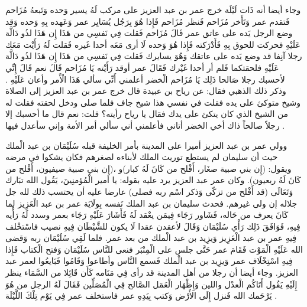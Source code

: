 وجاء أيضا أنه ذَات لَيْلَة خرج عمر بن عبد العزيز على مركب لَهُ يسير وَحده وَتَبعهُ مُزَاحم فَتقدم عمر وَتَأَخر مُزَاحم فَنظر مُزَاحم فَإِذا هُوَ بِرَجُل يُسَايِر عمر وَعَهده بِهِ وَحده وَقد وضع الرجل يَده على عاتق عمر قَالَ مُزَاحم فَقلت فِي نَفسِي من هَذَا إِن هَذَا لذُو دَالَّة عَلَيْهِ فحركت للحوق بِهِ فَأَدْرَكته فَإِذا هُوَ وَحده لَا أرى مَعَه أحدا غَيره فَقلت لَهُ رَأَيْت مَعَك رجلا آنِفا قد وضع يَده على عاتقك وَهُوَ يسايرك فَقلت فِي نَفسِي من هَذَا إِن هَذَا لذُو دَالَّة عَلَيْهِ فلحقتكما فَلم أر أحدا غَيْرك فَقَالَ عمر أوقد رَأَيْته يَا مُزَاحم قَالَ نعم قَالَ إِنِّي لأحسبك رجلا صَالحا ذَلِك يَا مُزَاحم الْخضر أعلمني أَنِّي سألي هَذَا الْأَمر وأعان عَلَيْهِ \cite{ibnAbdAlHakam_OmarIbnAbdAlAziz}. وذكر ذلك الذهبي فقال:  عن رياح بن عبيدة قال خرج عمر بن عبد العزيز إلى الصلاة وشيخ متوكئ على يده فقلت في نفسي هذا شيخ جاف فلما صلى ودخل لحقته فقلت له من الشيخ الذي كان يتكئ على يدك فقال يا رياح رأيته؟ قلت: نعم قال ما أحسبك إلا رجلاً صالحاً ذاك أخي الخضر أتاني فأعلمني أني سألي أمر الأمة وإني سأعدل فيها \cite{dahabi_Siyar}.

وولي عمر بن عبد العزيز أميرا على المدينة بأمر الخليفة قبله سُلَيْمَان بن عبد الْملك حيث أن سليمان لم يستطع توريث الملك لأبناءه لصغرهم فكان يشكوا في مرضه ويقول: (إِن بني صبية صغَار، أَفْلح من كَانَ لَهُ كبار)و ،(إِن بني صبية صيفيون، أَفْلح من كَانَ لَهُ ربعيون). وكان عمر عبد العزيز يرد عليه بقوله: يا أمير الْمُؤمنِينَ، يَقُول الله تبَارك وَتَعَالَى (قد أَفْلح من تزكّى وَذكر اسْم ربه فصلى) عارضا عليه أن يحتسب ذلك لله جل جلاله إن ولى غيرهم. فحدث سليمان بن عبد الملك نَفسه بِولَايَة عمر بن عبد الْعَزِيز لما كَانَ يعرف من حَاله، فَشَاور رَجَاء فِيمَن يعْقد لَهُ فَأَشَارَ عَلَيْهِ رَجَاء بعمر وسدد لَهُ رَأْيه فِيهِ، فَوَافَقَ ذَلِك رَأْي سُلَيْمَان وَقَالَ لأعقدن عقدا لَا يكون للشَّيْطَان فِيهِ نصيب فاسْتخْلف فِيهِ عمر بن عبد الْعَزِيز وَيزِيد بن عبد الْملك من بعد عمر. فلما لَقِي سُلَيْمَان ربه وَقضى الله عَلَيْهِ الْمَوْت فَقَامَ عمر حَتَّى جلس على الْمِنْبَر فنعى للنَّاس سُلَيْمَان وَفتح الْكتاب فَإِذا فِيهِ اسْتِخْلَاف عمر وَيزِيد بن عبد الْملك فَسمع النَّاس وأطاعوا وَقَامُوا فَبَايعُوا لعمر عبد العزيز. وجاء أيضا أن رجلا من أهل المدينة قد رأى فِي مَنَامه كَأَن قَائِلا من السَّمَاء ينظر إِلَيْهِ يَقُول أَتَاكُم الْعدْل واللين وَإِظْهَار الْعَمَل الصَّالح فِي الْمُصَلِّين فَقَالَ لَهُ الرجل من هُوَ يَرْحَمك الله فَنزل إِلَى الأَرْض وَكتب بِيَدِهِ عمر فاستخلف عمر فِي يَوْم تِلْكَ اللَّيْلَة \cite{ibnAbdAlHakam_OmarIbnAbdAlAziz}.

